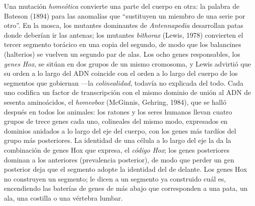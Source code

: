 \begin{definition}\label{def:b3:developmental-genetics:hox}
Una mutación \emph{homeótica} convierte una parte del cuerpo en otra:
la palabra de Bateson (1894) para las anomalías que ``sustituyen un
miembro de una serie por otro''. En la mosca, los mutantes dominantes
de \emph{Antennapedia} desarrollan patas donde deberían ir las antenas;
los mutantes \emph{bithorax} (Lewis, 1978) convierten el tercer
segmento torácico en una copia del segundo, de modo que los
balancines (halterios) se vuelven un segundo par de alas. Los ocho
genes responsables, los \emph{genes Hox}, se sitúan en dos grupos de un
mismo cromosoma, y Lewis advirtió que su orden a lo largo del ADN
coincide con el orden a lo largo del cuerpo de los segmentos que
gobiernan ---la \emph{colinealidad}, todavía no explicada del todo.
Cada uno codifica un factor de transcripción con el mismo dominio de
unión al ADN de sesenta aminoácidos, el \emph{homeobox} (McGinnis,
Gehring, 1984), que se halló después en todos los animales: los ratones
y los seres humanos llevan cuatro grupos de trece genes cada uno,
colineales del mismo modo, expresados en dominios anidados a lo largo
del eje del cuerpo, con los genes más tardíos del grupo más
posteriores. La identidad de una célula a lo largo del eje la da la
combinación de genes Hox que expresa, el \emph{código Hox}; los genes
posteriores dominan a los anteriores (prevalencia posterior), de modo
que perder un gen posterior deja que el segmento adopte la identidad
del de delante. Los genes Hox no construyen un segmento; le dicen a un
segmento ya construido cuál es, encendiendo las baterías de genes de
más abajo que corresponden a una pata, un ala, una costilla o una
vértebra lumbar.
\end{definition}

